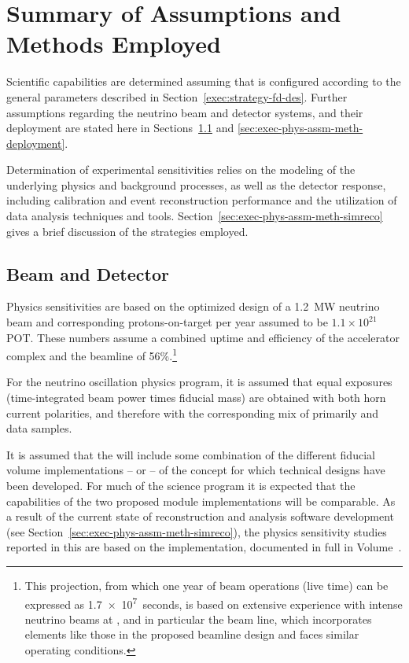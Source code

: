 \section{Summary of Assumptions and Methods Employed}
\label{sec:exec-phys-assm-meth}

Scientific capabilities are determined assuming that 
is configured according to the general parameters described 
in Section~\ref{exec:strategy-fd-des}. 
Further assumptions regarding the neutrino beam and detector 
systems, and their deployment are stated here in
Sections~\ref{sec:exec-phys-assm-meth-beamdetector} and
\ref{sec:exec-phys-assm-meth-deployment}. 

Determination of experimental sensitivities relies on the
modeling of the underlying physics and background processes,
as well as the detector response, including calibration and
event reconstruction performance and the utilization of data
analysis techniques and tools.
Section~\ref{sec:exec-phys-assm-meth-simreco} gives a brief discussion of the strategies employed. 

\subsection{Beam and Detector}
\label{sec:exec-phys-assm-meth-beamdetector}

Physics sensitivities are based on 
the optimized design of a \SI{1.2}{MW} neutrino beam and
corresponding protons-on-target per year assumed to
be $1.1 \times 10^{21}$ POT.  These numbers assume a combined
uptime and efficiency of the  accelerator complex and the
 beamline of 56\%.\footnote{This projection, from which one  
year of  beam operations (live time) can be expressed as \SI{1.7e7}{seconds}, 
is based on extensive 
experience with intense neutrino beams at , and in particular 
the  beam line, which incorporates elements like those in the  
proposed  beamline design and faces similar operating conditions.} 

For the neutrino oscillation physics program, it is assumed that
equal exposures (time-integrated beam power times fiducial mass) are obtained with both horn current polarities,
and therefore with the corresponding mix of primarily \numu
and \anumu data samples.

It is assumed that the   will include some
combination of the different \nominalmodsize fiducial volume
implementations --  or  -- of the  concept
for which technical designs have been developed.                                                     
For much of the science program it is expected that the
capabilities of the two proposed  module 
implementations will be comparable.  As a result of the
current state of reconstruction and analysis software development
(see Section~\ref{sec:exec-phys-assm-meth-simreco}), the
physics sensitivity studies reported in this  are based on
the   implementation,
documented in full in Volume~\volnumbersp{}. %

